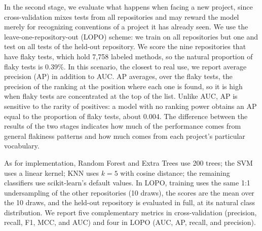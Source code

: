 In the second stage, we evaluate what happens when facing a new project, since cross-validation mixes tests from all repositories and may reward the model merely for recognizing conventions of a project it has already seen. We use the leave-one-repository-out (LOPO) scheme: we train on all repositories but one and test on all tests of the held-out repository. We score the nine repositories that have flaky tests, which hold 7,758 labeled methods, so the natural proportion of flaky tests is 0.39\%.  In this scenario, the closest to real use, we report average precision (AP) in addition to AUC. AP averages, over the flaky tests, the precision of the ranking at the position where each one is found, so it is high when flaky tests are concentrated at the top of the list. Unlike AUC, AP is sensitive to the rarity of positives: a model with no ranking power obtains an AP equal to the proportion of flaky tests, about 0.004. The difference between the results of the two stages indicates how much of the performance comes from general flakiness patterns and how much comes from each project's particular vocabulary.

As for implementation, Random Forest and Extra Trees use 200 trees; the SVM uses a linear kernel; KNN uses $k = 5$ with cosine distance; the remaining classifiers use scikit-learn's default values. In LOPO, training uses the same 1:1 undersampling of the other repositories (10 draws), the scores are the mean over the 10 draws, and the held-out repository is evaluated in full, at its natural class distribution. We report five complementary metrics in cross-validation (precision, recall, F1, MCC, and AUC) and four in LOPO (AUC, AP, recall, and precision). 

